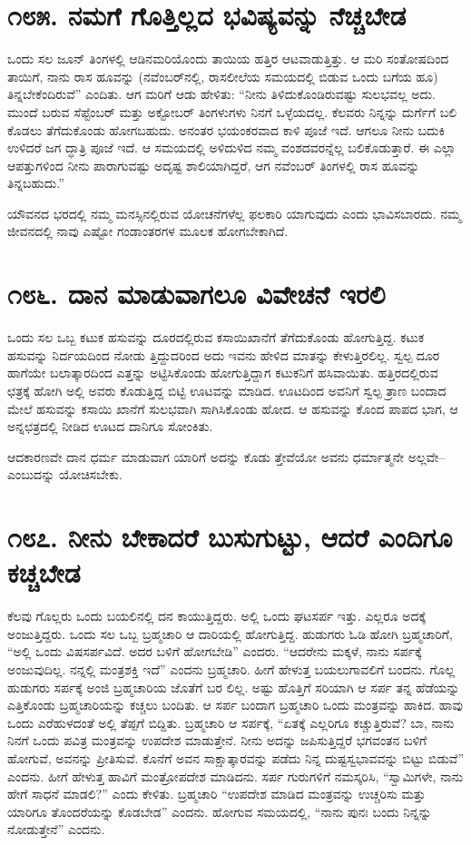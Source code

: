 \section{\num{೧೮೫. } ನಮಗೆ ಗೊತ್ತಿಲ್ಲದ ಭವಿಷ್ಯವನ್ನು ನೆಚ್ಚಬೇಡ}

ಒಂದು ಸಲ ಜೂನ್ ತಿಂಗಳಲ್ಲಿ ಆಡಿನಮರಿಯೊಂದು ತಾಯಿಯ ಹತ್ತಿರ ಆಟವಾಡುತ್ತಿತ್ತು. ಆ ಮರಿ ಸಂತೋಷದಿಂದ ತಾಯಿಗೆ, ನಾನು ರಾಸ ಹೂವನ್ನು (ನವೆಂಬರ್​ನಲ್ಲಿ, ರಾಸಲೀಲೆಯ ಸಮಯದಲ್ಲಿ ಬಿಡುವ ಒಂದು ಬಗೆಯ ಹೂ) ತಿನ್ನಬೇಕೆಂದಿರುವೆ” ಎಂದಿತು. ಆಗ ಮರಿಗೆ ಆಡು ಹೇಳಿತು: “ನೀನು ತಿಳಿದುಕೊಂಡಿರುವಷ್ಟು ಸುಲಭವಲ್ಲ ಅದು. ಮುಂದೆ ಬರುವ ಸೆಪ್ಟೆಂಬರ್ ಮತ್ತು ಅಕ್ಟೋಬರ್ ತಿಂಗಳುಗಳು ನಿನಗೆ ಒಳ್ಳೆಯದಲ್ಲ. ಕೆಲವರು ನಿನ್ನನ್ನು ದುರ್ಗೆಗೆ ಬಲಿ ಕೊಡಲು ತೆಗೆದುಕೊಂಡು ಹೋಗಬಹುದು. ಅನಂತರ ಭಯಂಕರವಾದ ಕಾಳಿ ಪೂಜೆ ಇದೆ. ಆಗಲೂ ನೀನು ಬದುಕಿ ಉಳಿದರೆ ಜಗ ದ್ಧಾತ್ರಿ ಪೂಜೆ ಇದೆ. ಆ ಸಮಯದಲ್ಲಿ ಅಳಿದುಳಿದ ನಮ್ಮ ವಂಶದವರನ್ನೆಲ್ಲ ಬಲಿಕೊಡುತ್ತಾರೆ. ಈ ಎಲ್ಲಾ ಆಪತ್ತುಗಳಿಂದ ನೀನು ಪಾರಾಗುವಷ್ಟು ಅದೃಷ್ಟ ಶಾಲಿಯಾಗಿದ್ದರೆ, ಆಗ ನವೆಂಬರ್ ತಿಂಗಳಲ್ಲಿ ರಾಸ ಹೂವನ್ನು ತಿನ್ನಬಹುದು.”

ಯೌವನದ ಭರದಲ್ಲಿ ನಮ್ಮ ಮನಸ್ಸಿನಲ್ಲಿರುವ ಯೋಚನೆಗಳೆಲ್ಲ ಫಲಕಾರಿ ಯಾಗುವುದು ಎಂದು ಭಾವಿಸಬಾರದು. ನಮ್ಮ ಜೀವನದಲ್ಲಿ ನಾವು ಎಷ್ಟೋ ಗಂಡಾಂತರಗಳ ಮೂಲಕ ಹೋಗಬೇಕಾಗಿದೆ.


\section{\num{೧೮೬. } ದಾನ ಮಾಡುವಾಗಲೂ ವಿವೇಚನೆ ಇರಲಿ}

ಒಂದು ಸಲ ಒಬ್ಬ ಕಟುಕ ಹಸುವನ್ನು ದೂರದಲ್ಲಿರುವ ಕಸಾಯಿಖಾನೆಗೆ ತೆಗೆದುಕೊಂಡು ಹೋಗುತ್ತಿದ್ದ. ಕಟುಕ ಹಸುವನ್ನು ನಿರ್ದಯದಿಂದ ನೋಡು ತ್ತಿದ್ದುದರಿಂದ ಅದು ಇವನು ಹೇಳಿದ ಮಾತನ್ನು ಕೇಳುತ್ತಿರಲಿಲ್ಲ. ಸ್ವಲ್ಪ ದೂರ ಹಾಗೆಯೇ ಬಲಾತ್ಕಾರದಿಂದ ಎತ್ತನ್ನು ಅಟ್ಟಿಸಿಕೊಂಡು ಹೋಗುತ್ತಿದ್ದಾಗ ಕಟುಕನಿಗೆ ಹಸಿವಾಯಿತು. ಹತ್ತಿರದಲ್ಲಿರುವ ಛತ್ರಕ್ಕೆ ಹೋಗಿ ಅಲ್ಲಿ ಅವರು ಕೊಡುತ್ತಿದ್ದ ಬಿಟ್ಟಿ ಊಟವನ್ನು ಮಾಡಿದ. ಊಟದಿಂದ ಅವನಿಗೆ ಸ್ವಲ್ಪ ತ್ರಾಣ ಬಂದಾದ ಮೇಲೆ ಹಸುವನ್ನು ಕಸಾಯಿ ಖಾನೆಗೆ ಸುಲಭವಾಗಿ ಸಾಗಿಸಿಕೊಂಡು ಹೋದ. ಆ ಹಸುವನ್ನು ಕೊಂದ ಪಾಪದ ಭಾಗ, ಆ ಅನ್ನಛತ್ರದಲ್ಲಿ ನೀಡಿದ ಊಟದ ದಾನಿಗೂ ಸೋಂಕಿತು.

ಆದಕಾರಣವೇ ದಾನ ಧರ್ಮ ಮಾಡುವಾಗ ಯಾರಿಗೆ ಅದನ್ನು ಕೊಡು ತ್ತೇವೆಯೋ ಅವನು ಧರ್ಮಾತ್ಮನೇ ಅಲ್ಲವೇ–ಎಂಬುದನ್ನು ಯೋಚಿಸಬೇಕು.


\section{\num{೧೮೭. } ನೀನು ಬೇಕಾದರೆ ಬುಸುಗುಟ್ಟು, ಆದರೆ ಎಂದಿಗೂ ಕಚ್ಚಬೇಡ}

ಕೆಲವು ಗೊಲ್ಲರು ಒಂದು ಬಯಲಿನಲ್ಲಿ ದನ ಕಾಯುತ್ತಿದ್ದರು. ಅಲ್ಲಿ ಒಂದು ಘಟಸರ್ಪ ಇತ್ತು. ಎಲ್ಲರೂ ಅದಕ್ಕೆ ಅಂಜುತ್ತಿದ್ದರು. ಒಂದು ಸಲ ಒಬ್ಬ ಬ್ರಹ್ಮಚಾರಿ ಆ ದಾರಿಯಲ್ಲಿ ಹೋಗುತ್ತಿದ್ದ. ಹುಡುಗರು ಓಡಿ ಹೋಗಿ ಬ್ರಹ್ಮಚಾರಿಗೆ, “ಅಲ್ಲಿ ಒಂದು ವಿಷಸರ್ಪವಿದೆ. ಅದರ ಬಳಿಗೆ ಹೋಗಬೇಡಿ” ಎಂದರು. “ಆದರೇನು ಮಕ್ಕಳೆ, ನಾನು ಸರ್ಪಕ್ಕೆ ಅಂಜುವುದಿಲ್ಲ. ನನ್ನಲ್ಲಿ ಮಂತ್ರಶಕ್ತಿ ಇದೆ” ಎಂದನು ಬ್ರಹ್ಮಚಾರಿ. ಹೀಗೆ ಹೇಳುತ್ತ ಬಯಲುಗಾವಲಿಗೆ ಬಂದನು. ಗೊಲ್ಲ ಹುಡುಗರು ಸರ್ಪಕ್ಕೆ ಅಂಜಿ ಬ್ರಹ್ಮಚಾರಿಯ ಜೊತೆಗೆ ಬರ ಲಿಲ್ಲ. ಅಷ್ಟು ಹೊತ್ತಿಗೆ ಸರಿಯಾಗಿ ಆ ಸರ್ಪ ತನ್ನ ಹೆಡೆಯನ್ನು ಎತ್ತಿಕೊಂಡು ಬ್ರಹ್ಮಚಾರಿಯನ್ನು ಕಚ್ಚಲು ಬಂದಿತು. ಆ ಸರ್ಪ ಬಂದಾಗ ಬ್ರಹ್ಮಚಾರಿ ಒಂದು ಮಂತ್ರವನ್ನು ಹಾಕಿದ. ಹಾವು ಒಂದು ಎರೆಹುಳದಂತೆ ಅಲ್ಲಿ ತೆಪ್ಪಗೆ ಬಿದ್ದಿತು. ಬ್ರಹ್ಮಚಾರಿ ಆ ಸರ್ಪಕ್ಕೆ, “ಏತಕ್ಕೆ ಎಲ್ಲರಿಗೂ ಕಚ್ಚುತ್ತಿರುವೆ? ಬಾ, ನಾನು ನಿನಗೆ ಒಂದು ಪವಿತ್ರ ಮಂತ್ರವನ್ನು ಉಪದೇಶ ಮಾಡುತ್ತೇನೆ. ನೀನು ಅದನ್ನು ಜಪಿಸುತ್ತಿದ್ದರೆ ಭಗವಂತನ ಬಳಿಗೆ ಹೋಗುವೆ, ಅವನನ್ನು ಪ್ರೀತಿಸುವೆ. ಕೊನೆಗೆ ಅವನ ಸಾಕ್ಷಾತ್ಕಾರವನ್ನು ಪಡೆದು ನಿನ್ನ ದುಷ್ಟಸ್ವಭಾವವನ್ನು ಬಿಟ್ಟು ಬಿಡುವೆ” ಎಂದನು. ಹೀಗೆ ಹೇಳುತ್ತ ಹಾವಿಗೆ ಮಂತ್ರೋಪದೇಶ ಮಾಡಿದನು. ಸರ್ಪ ಗುರುಗಳಿಗೆ ನಮಸ್ಕರಿಸಿ, “ಸ್ವಾಮಿಗಳೇ, ನಾನು ಹೇಗೆ ಸಾಧನೆ ಮಾಡಲಿ?” ಎಂದು ಕೇಳಿತು. ಬ್ರಹ್ಮಚಾರಿ “ಉಪದೇಶ ಮಾಡಿದ ಮಂತ್ರವನ್ನು ಉಚ್ಚರಿಸು ಮತ್ತು ಯಾರಿಗೂ ತೊಂದರೆಯನ್ನು ಕೊಡಬೇಡ” ಎಂದನು. ಹೋಗುವ ಸಮಯದಲ್ಲಿ, “ನಾನು ಪುನಃ ಬಂದು ನಿನ್ನನ್ನು ನೋಡುತ್ತೇನೆ” ಎಂದನು.

